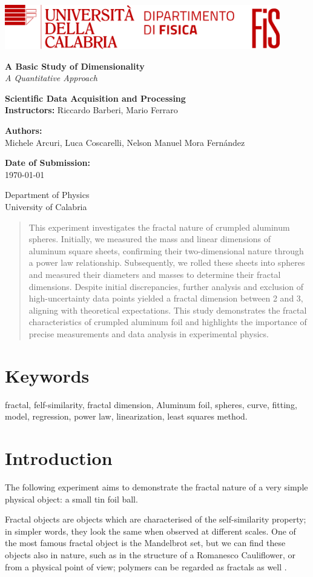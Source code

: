 \documentclass[a4paper,12pt]{article}
\newcommand{\customtitlepage}{
    

    \begin{titlepage}
        \includegraphics[width=0.9\textwidth]{logo.png}\\
        \centering
        \vspace*{1cm}
        
        \Huge\textbf{A Basic Study of Dimensionality}\\
        \vspace{0.5cm}
        \LARGE\textit{A Quantitative Approach}\\
        \vspace{1.5cm}
        
        \textbf{Scientific Data Acquisition and Processing} \\
        \textbf{Instructors:} Riccardo Barberi, Mario Ferraro\\
        \vspace{0.5cm}
        
        \textbf{Authors:}\\
        \large Michele Arcuri, Luca Coscarelli, Nelson Manuel Mora Fernández\\
        \vfill
        
        \large \textbf{Date of Submission:}\\
        \today\\
        \vspace{1.5cm}
        
        \small
        Department of Physics \\
        University of Calabria\\
        \vspace{0.5cm}
    \end{titlepage}
}
\begin{document}
\customtitlepage

\begin{abstract}
This experiment investigates the fractal nature of crumpled aluminum spheres. Initially, we measured the mass and linear 
dimensions of aluminum square sheets, confirming their two-dimensional nature through a power law relationship. Subsequently, 
we rolled these sheets into spheres and measured their diameters and masses to determine their fractal dimensions. 
Despite initial discrepancies, further analysis and exclusion of high-uncertainty data points yielded a fractal dimension between 2 and 3, 
aligning with theoretical expectations. This study demonstrates the fractal characteristics of crumpled aluminum foil and highlights
the importance of precise measurements and data analysis in experimental physics.
\end{abstract}


\section*{Keywords}
fractal, felf-similarity, fractal dimension, Aluminum foil, spheres, curve, fitting, model, regression, power law, linearization, least squares method.
\newpage

\tableofcontents
\newpage

\section{Introduction}
\par The following experiment aims to demonstrate the fractal nature 
of a very simple physical object: a small tin foil ball. 
 
\par Fractal objects are objects which are characterised of the self-similarity 
property; in simpler words, they look the same when observed at different scales.
One of the most famous fractal object is the Mandelbrot set, but we can find these 
objects also in nature, such as in the structure of a Romanesco Cauliflower, or 
from a physical point of view; polymers can be regarded as fractals as well \cite{rubinstein-2003}.
\end{document}
